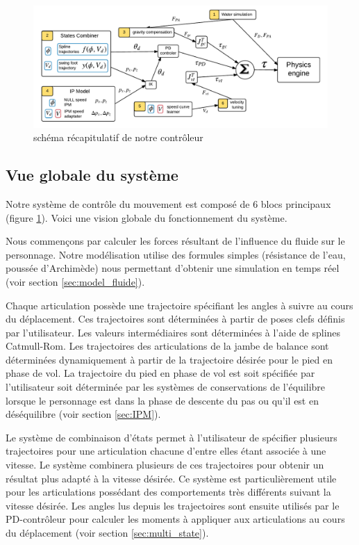 \documentclass[runningheads,a4paper]{llncs}
\begin{document}
\begin{figure}[h]
\centering
\includegraphics[scale=0.6]{general_process.pdf}
\caption{schéma récapitulatif de notre contrôleur}
\label{fig:shema_controler}
\end{figure}

\subsection{Vue globale du système}
%


Notre système de contrôle du mouvement est composé de 6 blocs principaux (figure \ref{fig:shema_controler}). Voici une vision globale du fonctionnement du système. 

Nous commençons par calculer les forces résultant de l'influence du fluide sur le personnage. Notre modélisation utilise des formules simples (résistance de l'eau, poussée d'Archimède) nous permettant d'obtenir une simulation en temps réel (voir section \ref{sec:model_fluide}).

Chaque articulation possède une trajectoire spécifiant les angles à suivre au cours du déplacement. Ces trajectoires sont déterminées à partir de poses clefs définis par l'utilisateur. Les valeurs intermédiaires sont déterminées à l'aide de splines Catmull-Rom. Les trajectoires des articulations de la jambe de balance sont déterminées dynamiquement à partir de la trajectoire désirée pour le pied en phase de vol. La trajectoire du pied en phase de vol est soit spécifiée par l'utilisateur soit déterminée par les systèmes de conservations de l'équilibre lorsque le personnage est dans la phase de descente du pas ou qu'il est en déséquilibre (voir section \ref{sec:IPM}).

Le système de combinaison d'états permet à l'utilisateur de spécifier plusieurs trajectoires pour une articulation chacune d'entre elles étant associée à une vitesse. Le système combinera plusieurs de ces trajectoires pour obtenir un résultat plus adapté à la vitesse désirée. Ce système est particulièrement utile pour les articulations possédant des comportements très différents suivant la vitesse désirée. Les angles lus depuis les trajectoires sont ensuite utilisés par le PD-contrôleur pour calculer les moments à appliquer aux articulations au cours du déplacement (voir section \ref{sec:multi_state}).
\end{document}
